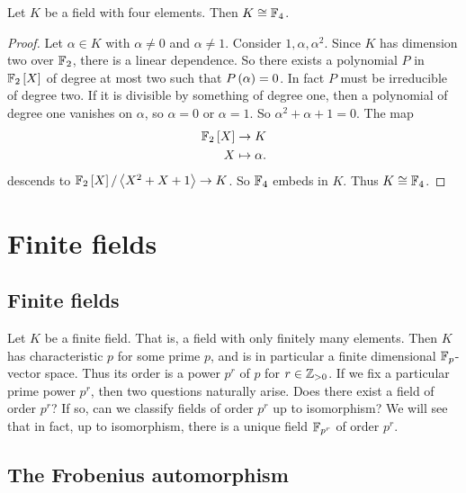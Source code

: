 \begin{proposition}
Let $ K $ be a field with four elements. Then $ K \cong \mathbb{F}_4 $.
\end{proposition}

\begin{proof}
Let $ \alpha \in K $ with $ \alpha \ne 0 $ and $ \alpha \ne 1 $. Consider $ 1, \alpha, \alpha^2 $. Since $ K $ has dimension two over $ \mathbb{F}_2 $, there is a linear dependence. So there exists a polynomial $ P $ in $ \mathbb{F}_2\left[ X \right] $ of degree at most two such that $ P\left( \alpha \right) = 0 $. In fact $ P $ must be irreducible of degree two. If it is divisible by something of degree one, then a polynomial of degree one vanishes on $ \alpha $, so $ \alpha = 0 $ or $ \alpha = 1 $. So $ \alpha^2 + \alpha + 1 = 0 $. The map
\begin{align*}
\mathbb{F}_2\left[ X \right] & \to K \\
X & \mapsto \alpha.
\end{align*}
descends to $ \mathbb{F}_2\left[ X \right] / \left\langle X^2 + X + 1 \right\rangle \to K $. So $ \mathbb{F}_4 $ embeds in $ K $. Thus $ K \cong \mathbb{F}_4 $.
\end{proof}

\pagebreak


\section{Finite fields}

\subsection{Finite fields}

Let $ K $ be a finite field. That is, a field with only finitely many elements. Then $ K $ has characteristic $ p $ for some prime $ p $, and is in particular a finite dimensional $ \mathbb{F}_p $-vector space. Thus its order is a power $ p^r $ of $ p $ for $ r \in \mathbb{Z}_{> 0} $. If we fix a particular prime power $ p^r $, then two questions naturally arise. Does there exist a field of order $ p^r $? If so, can we classify fields of order $ p^r $ up to isomorphism? We will see that in fact, up to isomorphism, there is a unique field $ \mathbb{F}_{p^r} $ of order $ p^r $.

\subsection{The Frobenius automorphism}

